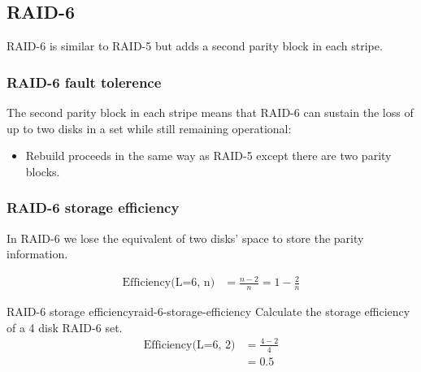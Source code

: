 \documentclass[slides]{pgnotes}
\begin{document}
\subsection{RAID-6}
\label{sec:raid-6}
\begin{minipage}{0.39\linewidth}
RAID-6 is similar to RAID-5 but adds a second parity block in each
stripe.

\subsubsection{RAID-6 fault tolerence}
\label{sec:raid-6-fault-tolerence}

The second parity block in each stripe means that RAID-6 can sustain the
loss of up to two disks in a set while still remaining operational:

\begin{itemize}

\item
  Rebuild proceeds in the same way as RAID-5 except there are two parity
  blocks.
\end{itemize}


\end{minipage}
\begin{minipage}{0.6\linewidth}
\end{minipage}
  
\subsubsection{RAID-6 storage efficiency}
\label{sec:raid-6-storage-efficiency}

In RAID-6 we lose the equivalent of two disks' space to store the parity
information.

\begin{align}
  \mbox{Efficiency(L=6, n)}  & =  \frac{n - 2}{n}  =  1 - \frac{2}{n} \label{eq:raid-6-storage-efficiency} 
\end{align}

\begin{example}{RAID-6 storage efficiency}{raid-6-storage-efficiency}
  Calculate the storage efficiency of a 4 disk RAID-6 set.
  \tcblower
\begin{align}
  \mbox{Efficiency(L=6, 2)}  & =  \frac{4 - 2}{4} \\
                             & = 0.5 
\end{align}  
\end{example}
\end{document}
